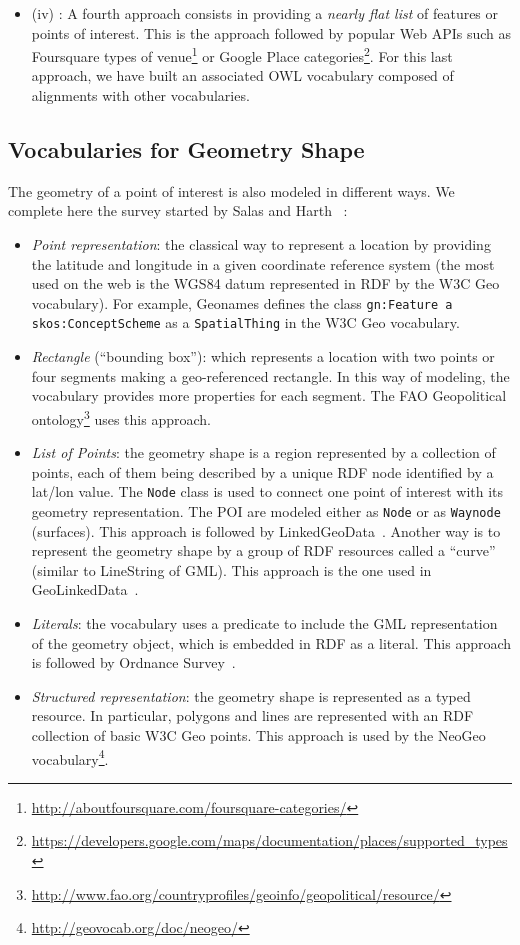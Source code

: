 \documentclass[a4paper,11pt]{report}
\begin{document}
\begin{itemize}
  \item (iv) : A fourth approach consists in providing a \textit{nearly flat list} of features or points of interest. This is the approach followed by popular Web APIs such as Foursquare types of venue\footnote{\url{http://aboutfoursquare.com/foursquare-categories/}} or Google Place categories\footnote{\url{https://developers.google.com/maps/documentation/places/supported_types}}. For this last approach, we have built an associated OWL vocabulary composed of alignments with other vocabularies.
\end{itemize}

\subsection{Vocabularies for Geometry Shape}
The geometry of a point of interest is also modeled in different ways. We complete here the survey started by Salas and Harth~\cite{Salas2011} :
\begin{itemize}
  \item \textit{Point representation}: the classical way to represent a location by providing the latitude and longitude in a given coordinate reference system (the most used on the web is the WGS84 datum represented in RDF by the W3C Geo vocabulary). For example, Geonames defines the class \texttt{gn:Feature a skos:ConceptScheme} as a \texttt{SpatialThing} in the W3C Geo vocabulary.
  \item \textit{Rectangle} (``bounding box''): which represents a location with two points or four segments making a geo-referenced rectangle. In this way of modeling, the vocabulary provides more properties for each segment. The FAO Geopolitical ontology\footnote{\url{http://www.fao.org/countryprofiles/geoinfo/geopolitical/resource/}} uses this approach.
  \item \textit{List of Points}: the geometry shape is a region represented by a collection of points, each of them being described by a unique RDF node identified by a lat/lon value. The \texttt{Node} class is used to connect one point of interest with its geometry representation. The POI are modeled either as \texttt{Node} or as \texttt{Waynode} (surfaces). This approach is followed by LinkedGeoData~\cite{linkedgeodata}. Another way is to represent the geometry shape by a group of RDF resources called a ``curve'' (similar to LineString of GML). This approach is the one used in GeoLinkedData~\cite{deLeon2010}.
   \item \textit{Literals}: the vocabulary uses a predicate to include the GML representation of the geometry object, which is embedded in RDF as a literal. This approach is followed by Ordnance Survey~\cite{Goodwin2008}.
  \item \textit{Structured representation}: the geometry shape is represented as a typed resource. In particular, polygons and lines are represented with an RDF collection of basic W3C Geo points. This approach is used by the NeoGeo vocabulary\footnote{\url{http://geovocab.org/doc/neogeo/}}.
\end{itemize}
\end{document}
